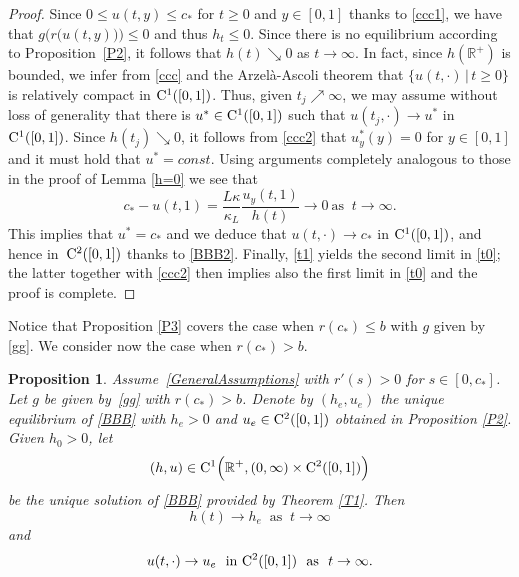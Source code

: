 \documentclass[reqno,11pt]{amsart}
\newtheorem{prop}[thm]{Proposition}
\numberwithin{equation}{section}
\begin{document}
\begin{proof}
Since $0\le u(t,y)\le c_*$ for $t\geq 0$ and $y\in [0,1]$ thanks to
\eqref{ccc1}, we have that $g\bigl(r\bigl(u(t,y)\bigr)\bigr)\leq 0$
and thus $h_t\leq 0$. Since there is no equilibrium according to Proposition~\ref{P2}, it follows
that $h(t)\searrow 0$ as $t\to \infty$. In fact, since
$h(\mathbb{R}^+)$ is bounded, we infer from \eqref{ccc} and the
Arzel\`{a}-Ascoli theorem that $\big\{u(t,\cdot)\, \big |\, t\geq 0\}$ is
relatively compact in ${\rm C}^1([0,1])$. Thus, given
$t_j\nearrow\infty$, we may assume without loss of generality that
there is $u^*\in {\rm C}^1([0,1])$ such that $u(t_j,\cdot)\to
u^*$ in ${\rm C}^1([0,1])$. Since $h(t_j)\searrow 0$, it
follows from \eqref{ccc2} that $u_y^*(y)=0$ for $y\in [0,1]$ and it
must hold that $u^*=const$. Using arguments completely analogous to
those in the proof of Lemma \ref{h=0} we see that
$$
  c_*-u(t,1)=\frac{L\kappa}{\kappa_L}\frac{u_y(t,1)}{h(t)}\to 0\ \text{
  as }\ t\to \infty.
$$
This implies that $u^*=c_*$ and we deduce that $u(t,\cdot)\to c_*$ in
${\rm C}^1([0,1])$, and hence in~${\rm C}^2([0,1])$
thanks to \eqref{BBB2}. Finally, \eqref{t1} yields the second limit in
\eqref{t0}; the latter together with \eqref{ccc2} then implies also
the first limit in \eqref{t0} and the proof is complete.
\end{proof}

Notice that Proposition \ref{P3} covers the case when $r(c_*)\leq b$
with $g$ given by \eqref{gg}. We consider now the case when $r(c_*)> b$.


\begin{prop}\label{P4}
Assume~\eqref{GeneralAssumptions} with  $r'(s)>0$ for $s\in [0,c_*]$. Let $g$ be given by~\eqref{gg}
with $r(c_*)> b$. Denote by $(h_e,u_e)$ the unique equilibrium of
\eqref{BBB} with $h_e>0$ and $u_e\in{\rm C}^2([0,1])$ 
obtained in Proposition \ref{P2}. Given $h_0>0$, let 
$$
(h,u)\in {\rm C}^1\Big(\mathbb{R}^+,(0,\infty)\times
{\rm C}^2([0,1])\Bigr)
$$
be the unique solution of \eqref{BBB} provided by Theorem
\ref{T1}. Then
$$
h(t)\to h_e\ \text{ as }\ t\to\infty
$$
and
$$
u(t,\cdot)\to u_e \ \text{ in }{\rm C}^2([0,1])\ \text{ as }\ t\to\infty.
$$
\end{prop}
\end{document}
